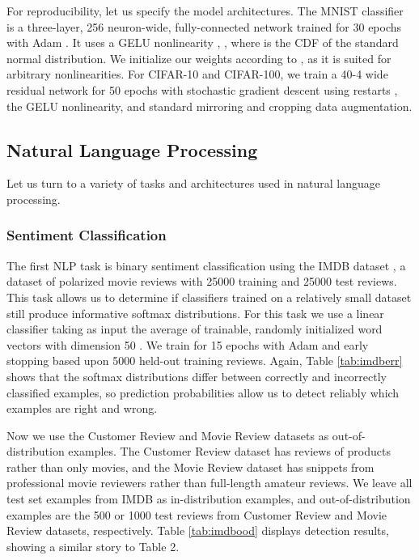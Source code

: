 \documentclass{article}
\begin{document}
For reproducibility, let us specify the model architectures. The MNIST classifier is a three-layer, 256 neuron-wide, fully-connected network trained for 30 epochs with Adam \citep{adam}. It uses a GELU nonlinearity \citep{gelu}, , where  is the CDF of the standard normal distribution. We initialize our weights according to \citep{init}, as it is suited for arbitrary nonlinearities. For CIFAR-10 and CIFAR-100, we train a 40-4 wide residual network \citep{wrn} for 50 epochs with stochastic gradient descent using restarts \citep{sgdr}, the GELU nonlinearity, and standard mirroring and cropping data augmentation.





\subsection{Natural Language Processing}
Let us turn to a variety of tasks and architectures used in natural language processing.
\subsubsection{Sentiment Classification}
The first NLP task is binary sentiment classification using the IMDB dataset \citep{maas}, a dataset of polarized movie reviews with 25000 training and 25000 test reviews. This task allows us to determine if classifiers trained on a relatively small dataset still produce informative softmax distributions. For this task we use a linear classifier taking as input the average of trainable, randomly initialized word vectors with dimension 50 \citep{fasttext, DAN}. We train for 15 epochs with Adam and early stopping based upon 5000 held-out training reviews. Again, Table \ref{tab:imdberr} shows that the softmax distributions differ between correctly and incorrectly classified examples, so prediction probabilities allow us to detect reliably which examples are right and wrong.

Now we use the Customer Review \citep{CR} and Movie Review \citep{MR} datasets as out-of-distribution examples. The Customer Review dataset has reviews of products rather than only movies, and the Movie Review dataset has snippets from professional movie reviewers rather than full-length amateur reviews. We leave all test set examples from IMDB as in-distribution examples, and out-of-distribution examples are the 500 or 1000 test reviews from Customer Review and Movie Review datasets, respectively. Table \ref{tab:imdbood} displays detection results, showing a similar story to Table 2.
\end{document}
